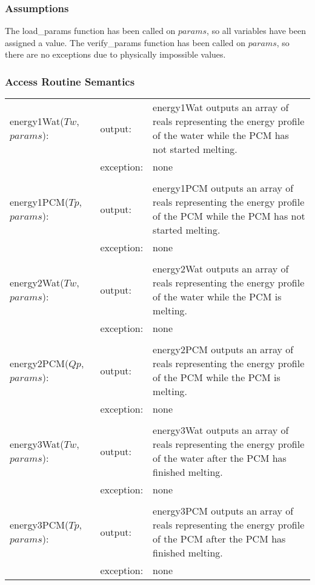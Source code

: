 \documentclass[12pt]{article}
\begin{document}
\subsubsection{Assumptions}
The load\_params function has been called on $params$, so all variables have been assigned a value. The verify\_params function has been called on $params$, so there are no exceptions due to physically impossible values.
\subsubsection{Access Routine Semantics}
\begin{center}
\begin{tabular}{l l p{10cm}}
energy1Wat($Tw$, $params$): & output: & energy1Wat outputs an array of reals representing the energy profile of the water while the PCM has not started melting. \\ 
& exception: & none \\ \\
energy1PCM($Tp$, $params$): & output: & energy1PCM outputs an array of reals representing the energy profile of the PCM while the PCM has not started melting. \\ 
& exception: & none \\ \\
energy2Wat($Tw$, $params$): & output: & energy2Wat outputs an array of reals representing the energy profile of the water while the PCM is melting. \\ 
& exception: & none \\ \\
energy2PCM($Qp$, $params$): & output: & energy2PCM outputs an array of reals representing the energy profile of the PCM while the PCM is melting. \\ 
& exception: & none \\ \\
energy3Wat($Tw$, $params$): & output: & energy3Wat outputs an array of reals representing the energy profile of the water after the PCM has finished melting. \\ 
& exception: & none \\ \\
energy3PCM($Tp$, $params$): & output: & energy3PCM outputs an array of reals representing the energy profile of the PCM after the PCM has finished melting. \\
& exception: & none \\
\end{tabular}
\end{center}
\end{document}
